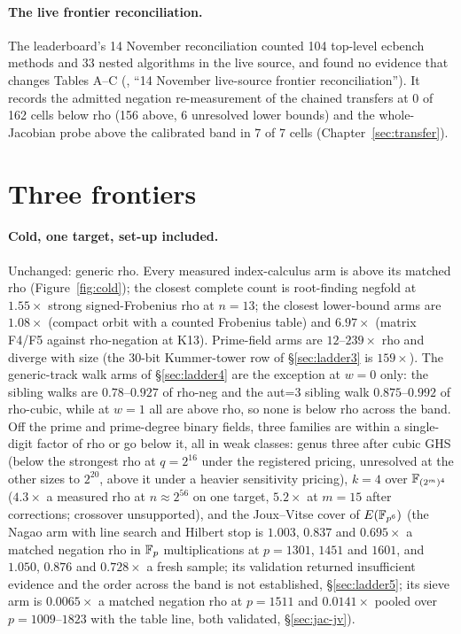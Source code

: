 \paragraph{The live frontier reconciliation.} The leaderboard's 14 November
reconciliation counted 104 top-level ecbench methods and 33 nested
algorithms in the live source, and found no evidence that changes Tables
A--C (, ``14 November live-source frontier
reconciliation''). It records the admitted negation re-measurement of the
chained transfers at 0 of 162 cells below rho (156 above, 6 unresolved
lower bounds) and the whole-Jacobian probe above the calibrated band in 7
of 7 cells (Chapter~\ref{sec:transfer}).

\section{Three frontiers}

\paragraph{Cold, one target, set-up included.} Unchanged: generic rho.
Every measured index-calculus arm is above its matched rho
(Figure~\ref{fig:cold}); the closest complete count is root-finding negfold
at $1.55\times$ strong signed-Frobenius rho at $n=13$; the closest
lower-bound arms are $1.08\times$ (compact orbit with a counted Frobenius
table) and $6.97\times$ (matrix F4/F5 against rho-negation at K13).
Prime-field arms are $12$--$239\times$ rho and diverge with size (the
30-bit Kummer-tower row of \S\ref{sec:ladder3} is $159\times$). The
generic-track walk arms of \S\ref{sec:ladder4} are the exception at
$w=0$ only: the sibling walks are $0.78$--$0.927$ of rho-neg and the aut=3
sibling walk $0.875$--$0.992$ of rho-cubic, while at $w=1$ all are above
rho, so none is below rho across the band. Off the
prime and prime-degree binary fields, three families are within a
single-digit factor of rho or go below it, all in weak classes: genus three after cubic GHS
(below the strongest rho at $q=2^{16}$ under the registered pricing,
unresolved at the other sizes to $2^{20}$, above it under a heavier
sensitivity pricing), $k=4$ over $\mathbb{F}_{(2^m)^4}$
($4.3\times$ a measured rho at $n\approx2^{56}$ on one target, $5.2\times$
at $m=15$ after corrections; crossover unsupported), and the Joux--Vitse
cover of $E(\mathbb{F}_{p^6})$ (the Nagao arm with line search and Hilbert stop
is $1.003$, $0.837$ and $0.695\times$ a matched negation rho in $\mathbb{F}_p$
multiplications at $p=1301$, $1451$ and $1601$, and $1.050$, $0.876$ and
$0.728\times$ a fresh sample; its validation returned insufficient
evidence and the order across the band is not established,
\S\ref{sec:ladder5}; its sieve arm is $0.0065\times$ a matched negation
rho at $p=1511$ and $0.0141\times$ pooled over $p=1009$--$1823$ with the
table line, both validated, \S\ref{sec:jac-jv}).

